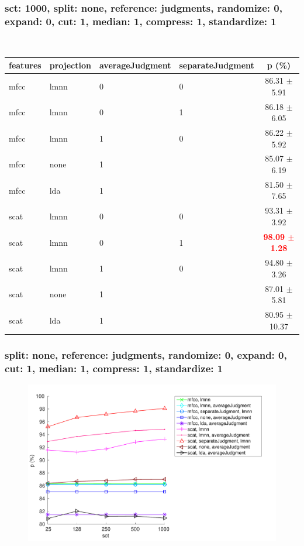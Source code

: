 \documentclass{beamer}
\begin{document}
\begin{frame}\frametitle{sct: 1000, split: none, reference: judgments, randomize: 0, expand: 0, cut: 1, median: 1, compress: 1, standardize: 1}  
 
\begin{table}  
\begin{center}  
\  
\setlength{\tabcolsep}{.16667em}  
\begin{tabular}{llllc}  
features & projection & averageJudgment & separateJudgment & p (\%) \\  
\hline  
mfcc & lmnn & 0 & 0 &  86.31 $\pm$5.91 \\  
mfcc & lmnn & 0 & 1 &  86.18 $\pm$6.05 \\  
mfcc & lmnn & 1 & 0 &  86.22 $\pm$5.92 \\  
mfcc & none & 1 &  &  85.07 $\pm$6.19 \\  
mfcc & lda & 1 &  &  81.50 $\pm$7.65 \\  
scat & lmnn & 0 & 0 &  93.31 $\pm$3.92 \\  
scat & lmnn & 0 & 1 & \textbf{\textcolor{red}{ 98.09 $\pm$1.28}} \\  
scat & lmnn & 1 & 0 &  94.80 $\pm$3.26 \\  
scat & none & 1 &  &  87.01 $\pm$5.81 \\  
scat & lda & 1 &  & 80.95 $\pm$10.37 \\  
\end{tabular}  
\end{center}  
\label{sc1000SpnoRejuRa0Ex0Cu1Me1Co1St1}  
\end{table}  
 
\end{frame}   
  
\begin{frame}\frametitle{\small split: none, reference: judgments, randomize: 0, expand: 0, cut: 1, median: 1, compress: 1, standardize: 1} 
\begin{center} 
\begin{figure} 
\centering 
\includegraphics[width=\textwidth,height=0.8\textheight,keepaspectratio]{./figures/Fig160.pdf} 
\label{spnoRejuRa0Ex0Cu1Me1Co1St1} 
\end{figure} 
\end{center} 
  
  
\end{frame}  
 
 
            
            
 
\end{document}
